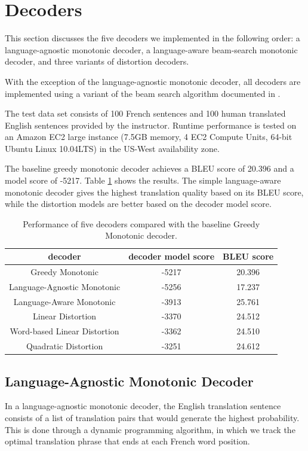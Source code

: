 \documentclass[12pt]{article}   %
\begin{document}
\section{Decoders}
This section discusses the five decoders we implemented in the following order: a language-agnostic monotonic decoder, a language-aware beam-search monotonic decoder, and three variants of distortion decoders.

With the exception of the language-agnostic monotonic decoder, all decoders are implemented using a variant of the beam search algorithm documented in \cite{pharaoh}.

The test data set consists of 100 French sentences and 100 human translated English sentences provided by the instructor. Runtime performance is tested on an Amazon EC2 large instance (7.5GB memory, 4 EC2 Compute Units, 64-bit Ubuntu Linux 10.04LTS) in the US-West availability zone.

The baseline greedy monotonic decoder achieves a BLEU score of 20.396 and a model score of -5217. Table \ref{tbl:perf} shows the results. The simple language-aware monotonic decoder gives the highest translation quality based on its BLEU score, while the distortion models are better based on the decoder model score.

\begin{table}
\label{tbl:perf}
\centering
\begin{tabular}{ c | c | c  }
	decoder & decoder model score & BLEU score \\
	\hline
	Greedy Monotonic & -5217 & 20.396 \\
	Language-Agnostic Monotonic & -5256 & 17.237 \\
	Language-Aware Monotonic & -3913 & 25.761 \\
	Linear Distortion & -3370 & 24.512 \\
	Word-based Linear Distortion & -3362 & 24.510 \\
	Quadratic Distortion & -3251 & 24.612 \\
\end{tabular}
\caption{Performance of five decoders compared with the baseline Greedy Monotonic decoder.}
\end{table}


\subsection{Language-Agnostic Monotonic Decoder}
In a language-agnostic monotonic decoder, the English translation sentence consists of a list of translation pairs that would generate the highest probability. This is done through a dynamic programming algorithm, in which we track the optimal translation phrase that ends at each French word position.
\end{document}
